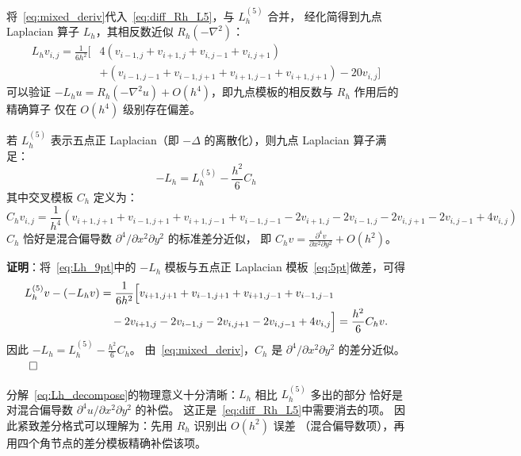 将~\eqref{eq:mixed_deriv}代入~\eqref{eq:diff_Rh_L5}，与 $L_h^{(5)}$ 合并，
经化简得到九点 Laplacian 算子 $L_h$，其相反数近似 $R_h(-\nabla^2)$：
\begin{equation}
  \begin{aligned}
  L_h v_{i,j}
  = \frac{1}{6h^2}\big[&
  4(v_{i-1,j} + v_{i+1,j} + v_{i,j-1} + v_{i,j+1}) \\
  &+ (v_{i-1,j-1} + v_{i-1,j+1}
      + v_{i+1,j-1} + v_{i+1,j+1})
  - 20v_{i,j}\big]
  \end{aligned}
  \label{eq:Lh_9pt}
\end{equation}
可以验证 $-L_h u = R_h(-\nabla^2 u) + O(h^4)$，即九点模板的相反数与 $R_h$ 作用后的精确算子
仅在 $O(h^4)$ 级别存在偏差。

\begin{lemma}[$L_h$ 的算子精确分解]
  \label{lem:Lh_decompose}
  若 $L_h^{(5)}$ 表示五点正 Laplacian（即 $-\Delta$ 的离散化），则九点 Laplacian 算子满足：
  \begin{equation}
    -L_h = L_h^{(5)} - \frac{h^2}{6}C_h
    \label{eq:Lh_decompose}
  \end{equation}
  其中交叉模板 $C_h$ 定义为：
  \begin{equation}
    C_h v_{i,j} = \frac{1}{h^4}(v_{i+1,j+1} + v_{i-1,j+1} + v_{i+1,j-1} + v_{i-1,j-1}
    - 2v_{i+1,j} - 2v_{i-1,j} - 2v_{i,j+1} - 2v_{i,j-1} + 4v_{i,j})
    \label{eq:Ch_def}
  \end{equation}
  $C_h$ 恰好是混合偏导数 $\partial^4/\partial x^2\partial y^2$ 的标准差分近似，
  即 $C_h v = \frac{\partial^4 v}{\partial x^2\partial y^2} + O(h^2)$。

  \textbf{证明}：将~\eqref{eq:Lh_9pt}中的 $-L_h$ 模板与五点正 Laplacian 模板~\eqref{eq:5pt}做差，可得
  \begin{align}
    L_h^{(5)}v - (-L_h v)
    &= \frac{1}{6h^2}\Big[
    v_{i+1,j+1}+v_{i-1,j+1}+v_{i+1,j-1}+v_{i-1,j-1} \notag\\
    &\quad -2v_{i+1,j}-2v_{i-1,j}-2v_{i,j+1}-2v_{i,j-1}+4v_{i,j}\Big]
    = \frac{h^2}{6}C_h v .
  \end{align}
  因此 $-L_h = L_h^{(5)}-\frac{h^2}{6}C_h$。
  由~\eqref{eq:mixed_deriv}，$C_h$ 是 $\partial^4/\partial x^2\partial y^2$ 的差分近似。$\qed$
\end{lemma}

\begin{remark}
  分解~\eqref{eq:Lh_decompose}的物理意义十分清晰：$L_h$ 相比 $L_h^{(5)}$ 多出的部分
  恰好是对混合偏导数 $\partial^4 u/\partial x^2\partial y^2$ 的补偿。
  这正是~\eqref{eq:diff_Rh_L5}中需要消去的项。
  因此紧致差分格式可以理解为：先用 $R_h$ 识别出 $O(h^2)$ 误差
  （混合偏导数项），再用四个角节点的差分模板精确补偿该项。
\end{remark}

